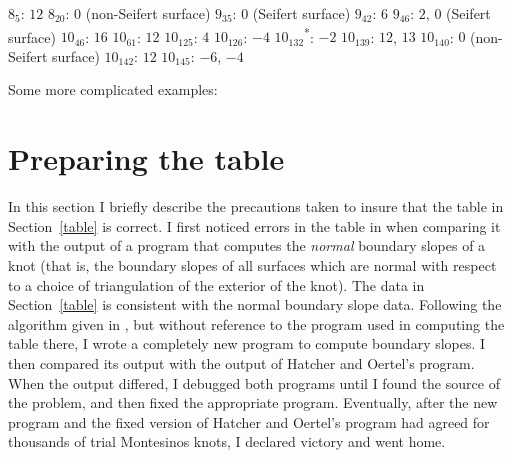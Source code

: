 \documentclass{elsart}
\makeatletter
\newcommand{\error}{\textsuperscript{*}}
\newenvironment{semitable}
               {\small
                 \let\\\@centercr
                 \list{}{\itemsep      \z@
                        \itemindent   -1.5em%
                        \listparindent\itemindent
                        \rightmargin  0.0em
                        }%
                \item\relax}
               {\endlist}
\makeatother
\begin{document}
\begin{semitable}
$8_5$:  $12$ \\
$8_{20}$:     $0$ (non-Seifert surface)\\
$9_{35}$:    $0$ (Seifert surface)\\
$9_{42}$: $6$ \\
$9_{46}$: $2$, $0$ (Seifert surface)\\
$10_{46}$:        $16$\\
$10_{61}$:        $12$\\
$10_{125}$: $4$ \\
$10_{126}$:       $-4$ \\
$10_{132}$\error: $-2$\\
$10_{139}$: $12$, $13$\\
$10_{140}$: $0$ (non-Seifert surface)\\
$10_{142}$: $12$ \\
$10_{145}$: $-6$, $-4$\\
\end{semitable}

Some more complicated examples:

\begin{semitable}

\end{semitable}

\section{Preparing the table}\label{method}

In this section I briefly describe the precautions taken to insure
that the table in Section~\ref{table} is correct.  I first noticed
errors in the table in \cite{HatcherOertel} when comparing it with the
output of a program that computes the {\em normal} boundary slopes of
a knot (that is, the boundary slopes of all surfaces which are normal
with respect to a choice of triangulation of the exterior of the
knot).  The data in Section~\ref{table} is consistent with the normal
boundary slope data.  Following the algorithm given in
\cite{HatcherOertel}, but without reference to the program used in
computing the table there, I wrote a completely new program to compute
boundary slopes.  I then compared its output with the output of
Hatcher and Oertel's program.  When the output differed, I debugged
both programs until I found the source of the problem, and then fixed
the appropriate program.  Eventually, after the new program and the
fixed version of Hatcher and Oertel's program had agreed for thousands
of trial Montesinos knots, I declared victory and went home.
\end{document}
